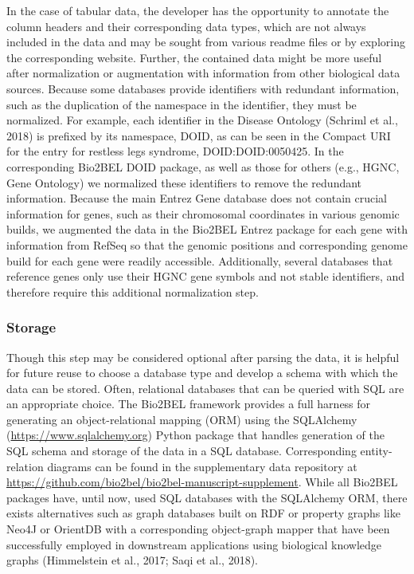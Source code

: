 In the case of tabular data, the developer has the opportunity to annotate the column headers and their corresponding data types, which are not always included in the data and may be sought from various readme files or by exploring the corresponding website.
Further, the contained data might be more useful after normalization or augmentation with information from other biological data sources.
Because some databases provide identifiers with redundant information, such as the duplication of the namespace in the identifier, they must be normalized.
For example, each identifier in the Disease Ontology (Schriml et al., 2018) is prefixed by its namespace, DOID, as can be seen in the Compact URI for the entry for restless legs syndrome, DOID:DOID:0050425.
In the corresponding Bio2BEL DOID package, as well as those for others (e.g., HGNC, Gene Ontology) we normalized these identifiers to remove the redundant information.
Because the main Entrez Gene database does not contain crucial information for genes, such as their chromosomal coordinates in various genomic builds, we augmented the data in the Bio2BEL Entrez package for each gene with information from RefSeq so that the genomic positions and corresponding genome build for each gene were readily accessible.
Additionally, several databases that reference genes only use their HGNC gene symbols and not stable identifiers, and therefore require this additional normalization step.

\subsubsection*{Storage}
Though this step may be considered optional after parsing the data, it is helpful for future reuse to choose a database type and develop a schema with which the data can be stored.
Often, relational databases that can be queried with SQL are an appropriate choice.
The Bio2BEL framework provides a full harness for generating an object-relational mapping (ORM) using the SQLAlchemy (\url{https://www.sqlalchemy.org}) Python package that handles generation of the SQL schema and storage of the data in a SQL database.
Corresponding entity-relation diagrams can be found in the supplementary data repository at \url{https://github.com/bio2bel/bio2bel-manuscript-supplement}.
While all Bio2BEL packages have, until now, used SQL databases with the SQLAlchemy ORM, there exists alternatives such as graph databases built on RDF or property graphs like Neo4J or OrientDB with a corresponding object-graph mapper that have been successfully employed in downstream applications using biological knowledge graphs (Himmelstein et al., 2017; Saqi et al., 2018).

